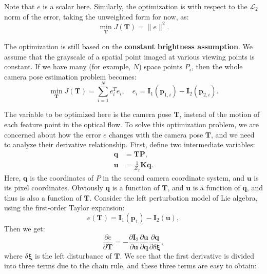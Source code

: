 Note that $e$ is a scalar here. Similarly, the optimization is with respect to the $\mathcal{L}_2$ norm of the error, taking the unweighted form for now, as:
\begin{equation}
\mathop {\min }\limits_{\mathbf{T}}  J\left( \mathbf{T}  \right) = \|e\|^2.
\end{equation}

The optimization is still based on the \textbf{constant brightness assumption}. We assume that the grayscale of a spatial point imaged at various viewing points is constant. If we have many (for example, $N$) space points $P_i$, then the whole camera pose estimation problem becomes:
\begin{equation}
\mathop {\min }\limits_{\mathbf{T}}  J\left( \mathbf{T}  \right) = \sum\limits_{i = 1}^N {e_i^T{e_i}}, \quad {e_i} = {\mathbf{I}_1}\left( {{\mathbf{p}_{1,i}}} \right) - {\mathbf{I}_2}\left( {{ \mathbf{p}_{2,i}}} \right).
\end{equation}

The variable to be optimized here is the camera pose $\mathbf{T}$, instead of the motion of each feature point in the optical flow. To solve this optimization problem, we are concerned about how the error $e$ changes with the camera pose $\mathbf{T}$, and we need to analyze their derivative relationship. First, define two intermediate variables:
\begin{align*}
\mathbf{q} &= \mathbf{T} \mathbf{P}, \\
\mathbf{u} &= \frac{1}{{{Z_2}}} \mathbf{K} \mathbf{q}.
\end{align*}
Here, $\mathbf{q}$ is the coordinates of $P$ in the second camera coordinate system, and $\mathbf{u}$ is its pixel coordinates. Obviously $\mathbf{q}$ is a function of $\mathbf{T}$, and $\mathbf{u}$ is a function of $\mathbf{q}$, and thus is also a function of $\mathbf{T}$. Consider the left perturbation model of Lie algebra, using the first-order Taylor expansion:
\begin{equation}
e(\mathbf{T})=\mathbf{I}_1(\mathbf{p}_{1})-\mathbf{I}_2(\mathbf{u}),
\end{equation}
Then we get:
\begin{equation}
\frac{\partial e}{\partial \mathbf{T}} = -\frac{{\partial {\mathbf{I}_2}}}{{\partial \mathbf{u}}}\frac{{\partial \mathbf{u}}}{{\partial \mathbf{q}}}\frac{{\partial \mathbf{q}}}{{\partial \delta \boldsymbol{\xi} }},
\end{equation}
where $\delta \boldsymbol{\xi}$ is the left disturbance of $\mathbf{T}$. We see that the first derivative is divided into three terms due to the chain rule, and these three terms are easy to obtain:

